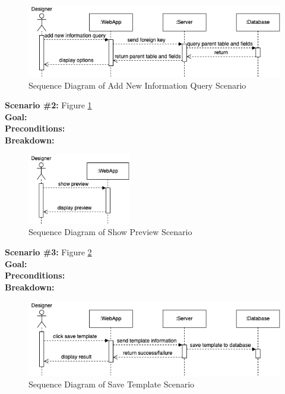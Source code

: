 \begin{figure}[ht!]
    \centering
    \includegraphics[width=\textwidth]{overleaf/images/add_new_information_query.png}
    \caption{Sequence Diagram of Add New Information Query Scenario}
    \label{fig:add_new_information_query}
\end{figure}

\noindent
\textbf{Scenario \#2:} Figure \ref{fig:add_new_information_query} \\
\textbf{Goal:} \\
\textbf{Preconditions:} \\
\textbf{Breakdown:} \\

\begin{figure}[ht!]
    \centering
    \includegraphics[width=0.4\textwidth]{overleaf/images/show_preview.png}
    \caption{Sequence Diagram of Show Preview Scenario}
    \label{fig:show_preview}
\end{figure}

\noindent
\textbf{Scenario \#3:} Figure \ref{fig:show_preview} \\
\textbf{Goal:} \\
\textbf{Preconditions:} \\
\textbf{Breakdown:} \\

\begin{figure}[ht!]
    \centering
    \includegraphics[width=\textwidth]{overleaf/images/save_template.png}
    \caption{Sequence Diagram of Save Template Scenario}
    \label{fig:save_template}
\end{figure}

